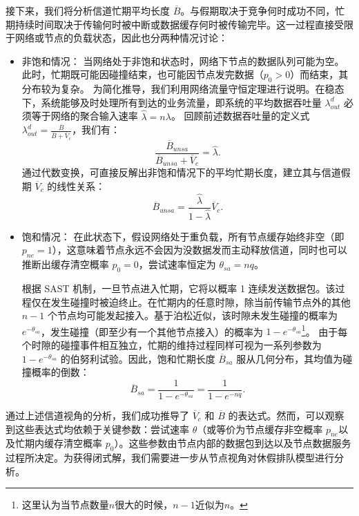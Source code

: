 接下来，我们将分析信道忙期平均长度 $\overline{B}$。与假期取决于竞争何时成功不同，忙期持续时间取决于传输何时被中断或数据缓存何时被传输完毕。这一过程直接受限于网络或节点的负载状态，因此也分两种情况讨论：
\begin{itemize}
	\item 非饱和情况： 
	当网络处于非饱和状态时，网络下节点的数据队列可能为空。此时，忙期既可能因碰撞结束，也可能因节点发完数据（$p_0 > 0$）而结束，其分布较为复杂。
	为简化推导，我们利用网络流量守恒定理进行说明。在稳态下，系统能够及时处理所有到达的业务流量，即系统的平均数据吞吐量 $\lambda_{out}^d$ 必须等于网络的聚合输入速率 $\hat{\lambda} = n\lambda$。
	回顾前述数据吞吐量的定义式 $\lambda_{out}^d = \frac{\overline{B}}{\overline{B} + \overline{V}_c}$，我们有：
	\begin{equation}
		\frac{\overline{B}_{unsa}}{\overline{B}_{unsa} + \overline{V}_c} = \hat{\lambda}.
	\end{equation}
	通过代数变换，可直接反解出非饱和情况下的平均忙期长度，建立其与信道假期 $\overline{V}_c$ 的线性关系：
	\begin{equation}
		\overline{B}_{unsa} = \frac{\hat{\lambda}}{1 - \hat{\lambda}} \overline{V}_c.
	\end{equation}

	\item 饱和情况： 
	在此状态下，假设网络处于重负载，所有节点缓存始终非空（即 $p_{ne}=1$），这意味着节点永远不会因为没数据发而主动释放信道，同时也可以推断出缓存清空概率 $p_0 = 0$，尝试速率恒定为 $\theta_{sa} = nq$。
	
	根据 SAST 机制，一旦节点进入忙期，它将以概率 1 连续发送数据包。该过程仅在发生碰撞时被迫终止。在忙期内的任意时隙，除当前传输节点外的其他 $n-1$ 个节点均可能发起接入。基于泊松近似，该时隙未发生碰撞的概率为 $e^{-\theta_{sa}}$，发生碰撞（即至少有一个其他节点接入）的概率为 $1 - e^{-\theta_{sa}}$\footnote{这里认为当节点数量$n$很大的时候，$n-1$近似为$n$。}。
	由于每个时隙的碰撞事件相互独立，忙期的维持过程同样可视为一系列参数为 $1 - e^{-\theta_{sa}}$ 的伯努利试验。因此，饱和忙期长度 $\overline{B}_{sa}$ 服从几何分布，其均值为碰撞概率的倒数：
	\begin{equation}
		\overline{B}_{sa} = \frac{1}{1 - e^{-\theta_{sa}}} = \frac{1}{1 - e^{-nq}}.
	\end{equation}
	

\end{itemize}

通过上述信道视角的分析，我们成功推导了 $\overline{V}_c$ 和 $\overline{B}$ 的表达式。然而，可以观察到这些表达式均依赖于关键参数：尝试速率 $\theta$（或等价为节点缓存非空概率 $p_{ne}$以及忙期内缓存清空概率 $p_0$）。这些参数由节点内部的数据包到达以及节点数据服务过程所决定。为获得闭式解，我们需要进一步从节点视角对休假排队模型进行分析。


